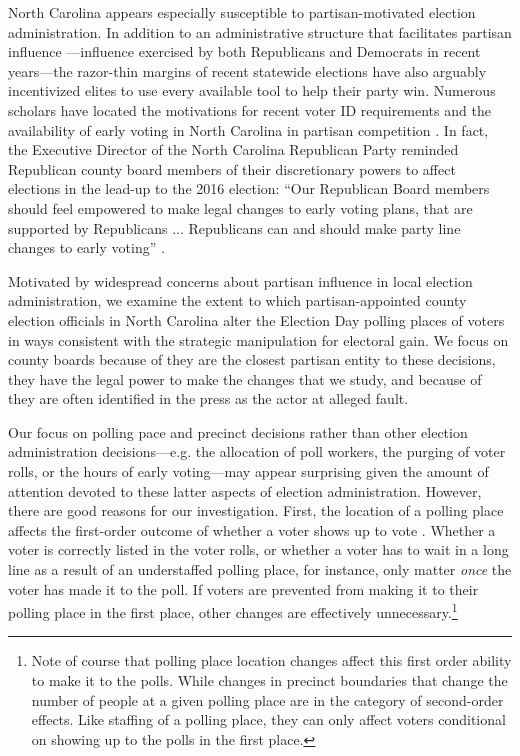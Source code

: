 \documentclass[12pt]{article}
\begin{document}
North Carolina appears especially susceptible to partisan-motivated election administration. In addition to an administrative structure that facilitates partisan influence ---influence exercised by both Republicans and Democrats in recent years---the razor-thin margins of recent statewide elections have also arguably incentivized elites to use every available tool to help their party win.  Numerous scholars have located the motivations for recent voter ID requirements and the availability of early voting in North Carolina in partisan competition \citep{Graham:2016wq,stern2018,michaelson2016,ingraham2016}.  In fact, the Executive Director of the North Carolina Republican Party reminded Republican county board members of their discretionary powers to affect elections in the lead-up to the 2016 election: ``Our Republican Board members should feel empowered to make legal changes to early voting plans, that are supported by Republicans $\ldots$ Republicans can and should make party line changes to early voting'' \citep{campbell2016c}.

Motivated by widespread concerns about partisan influence in local election administration, we examine the extent to which partisan-appointed county election officials in North Carolina alter the Election Day polling places of voters in ways consistent with the strategic manipulation for electoral gain.  We focus on county boards because of they are the closest partisan entity to these decisions, they have the legal power to make the changes that we study, and because of they are often identified in the press as the actor at alleged fault.  %

Our focus on polling pace and precinct decisions rather than other election administration decisions---e.g. the allocation of poll workers, the purging of voter rolls, or the hours of early voting---may appear surprising given the amount of attention devoted to these latter aspects of election administration.  However, there are good reasons for our investigation.  First, the location of a polling place affects the first-order outcome of whether a voter shows up to vote \citep{brady2011turning}.  Whether a voter is correctly listed in the voter rolls, or whether a voter has to wait in a long line as a result of an understaffed polling place, for instance, only matter \emph{once} the voter has made it to the poll.  If voters are prevented from making it to their polling place in the first place, other changes are effectively unnecessary.\footnote{Note of course that polling place location changes affect this first order ability to make it to the polls.  While changes in precinct boundaries that change the number of people at a given polling place are in the category of second-order effects.  Like staffing of a polling place, they can only affect voters conditional on showing up to the polls in the first place.}
\end{document}

